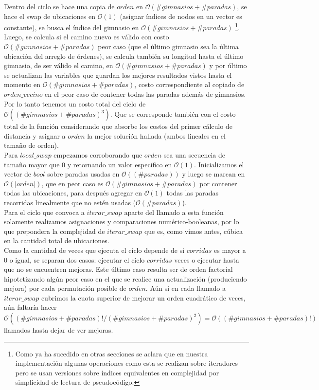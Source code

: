     Dentro del ciclo se hace una copia de $orden$ en $\mathcal{O}(\#gimnasios + \#paradas)$, se hace el swap de ubicaciones en $\mathcal{O}(1)$ (asignar índices de nodos en un vector es constante), se busca el índice del gimnasio en $\mathcal{O}(\#gimnasios + \#paradas)$ \footnote{Como ya ha sucedido en otras secciones se aclara que en nuestra implementación algunas operaciones como esta se realizan sobre iteradores pero se usan versiones sobre índices equivalentes en complejidad por simplicidad de lectura de pseudocódigo.}. Luego, se calcula si el camino nuevo es válido con costo $\mathcal{O}(\#gimnasios + \#paradas)$ peor caso (que el último gimnasio sea la última ubicación del arreglo de órdenes), se calcula también su longitud hasta el último gimnasio, de ser válido el camino, en $\mathcal{O}(\#gimnasios + \#paradas)$ y por último se actualizan las variables que guardan los mejores resultados vistos hasta el momento en $\mathcal{O}(\#gimnasios + \#paradas)$, costo correspondiente al copiado de $orden\_vecino$ en el peor caso de contener todas las paradas además de gimnasios.
    \\

    Por lo tanto tenemos un costo total del ciclo de $\mathcal{O}((\#gimnasios + \#paradas)^3)$. Que se corresponde también con el costo total de la función considerando que absorbe los costos del primer cálculo de distancia y asignar a $orden$ la mejor solución hallada (ambos lineales en el tamaño de orden).
    \\

    Para $local\_swap$ empezamos corroborando que $orden$ sea una secuencia de tamaño mayor que 0 y retornando un valor específico en $\mathcal{O}(1)$. Inicializamos el vector de $bool$ sobre paradas usadas en $\mathcal{O}((\#paradas))$ y luego se marcan en $\mathcal{O}(|orden|)$, que en peor caso es $\mathcal{O}(\#gimnasios + \#paradas)$ por contener todas las ubicaciones, para después agregar en $\mathcal{O}(1)$ todas las paradas recorridas linealmente que no estén usadas ($\mathcal{O}(\#paradas)$).
    \\

    Para el ciclo que convoca a $iterar\_swap$ aparte del llamado a esta función solamente realizamos asignaciones y comparaciones numérico-booleanas, por lo que prepondera la complejidad de $iterar\_swap$ que es, como vimos antes, cúbica en la cantidad total de ubicaciones.
    \\

    Como la cantidad de veces que ejecuta el ciclo depende de si $corridas$ es mayor a 0 o igual, se separan dos casos: ejecutar el ciclo $corridas$ veces o ejecutar hasta que no se encuentren mejoras. Este último caso resulta ser de orden factorial hipotetizando algún peor caso en el que se realice una actualización (produciendo mejora) por cada permutación posible de $orden$. Aún si en cada llamado a $iterar\_swap$ cubrimos la cuota superior de mejorar un orden cuadrático de veces, aún faltaría hacer $\mathcal{O}((\#gimnasios + \#paradas)!/(\#gimnasios + \#paradas)^2) = \mathcal{O} ((\#gimnasios + \#paradas)!)$ llamados hasta dejar de ver mejoras.
    \\

